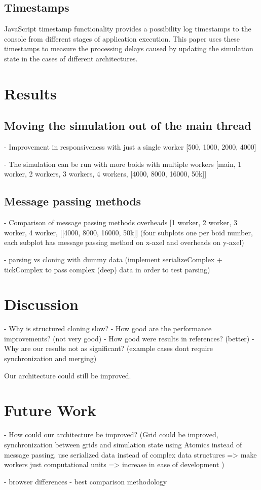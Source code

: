 \documentclass[conference]{IEEEtran}
\begin{document}
\subsection{Timestamps}

JavaScript timestamp functionality provides a possibility log timestamps to the console from different stages of application execution. This paper uses these timestamps to
measure the processing delays caused by updating the simulation state in the cases of different architectures.

\section{Results}
\label{sec:sec2}

\subsection{Moving the simulation out of the main thread}
- Improvement in responsiveness with just a single worker [500, 1000, 2000, 4000]

- The simulation can be run with more boids with multiple workers [main, 1 worker, 2 workers, 3 workers, 4 workers, [4000, 8000, 16000, 50k]]

\subsection{Message passing methods}
- Comparison of message passing methods overheads [1 worker, 2 worker, 3 worker, 4 worker, [[4000, 8000, 16000, 50k]] (four subplots one per boid number, each subplot has message passing method on x-axel and overheads on y-axel)

- parsing vs cloning with dummy data (implement serializeComplex + tickComplex to pass complex (deep) data in order to test parsing)

\section{Discussion}
\label{sec:disc}

- Why is structured cloning slow?
- How good are the performance improvements? (not very good)
- How good were results in references? (better)
- Why are our results not as significant? (example cases dont require synchronization and merging)


Our architecture could still be improved.



\section{Future Work}
\label{sec:ftr}
- How could our architecture be improved? (Grid could be improved, synchronization between grids and simulation state using Atomics instead of message passing, use serialized data instead of complex data structures => make workers just computational units => increase in ease of development )

- browser differences
- best comparison methodology

\printbibliography[title={References}]
\end{document}
